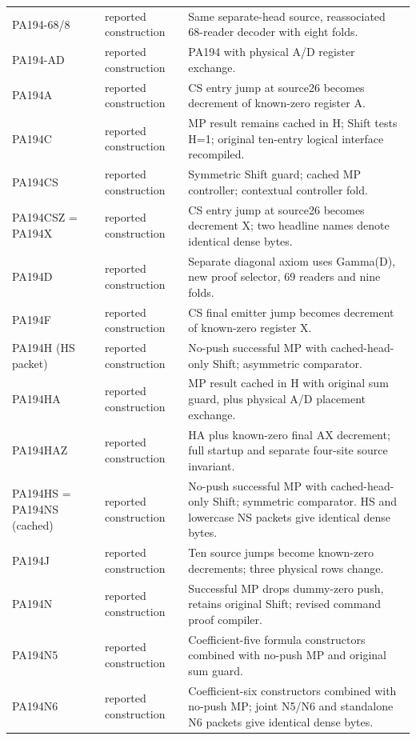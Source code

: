 \begin{longtable}{@{}p{.23\linewidth}p{.14\linewidth}p{.57\linewidth}@{}}
PA194-68/8 & reported construction & Same separate-head source, reassociated 68-reader decoder with eight folds.\\
PA194-AD & reported construction & PA194 with physical A/D register exchange.\\
PA194A & reported construction & CS entry jump at source26 becomes decrement of known-zero register A.\\
PA194C & reported construction & MP result remains cached in H; Shift tests H=1; original ten-entry logical interface recompiled.\\
PA194CS & reported construction & Symmetric Shift guard; cached MP controller; contextual controller fold.\\
PA194CSZ = PA194X & reported construction & CS entry jump at source26 becomes decrement X; two headline names denote identical dense bytes.\\
PA194D & reported construction & Separate diagonal axiom uses Gamma(D), new proof selector, 69 readers and nine folds.\\
PA194F & reported construction & CS final emitter jump becomes decrement of known-zero register X.\\
PA194H (HS packet) & reported construction & No-push successful MP with cached-head-only Shift; asymmetric comparator.\\
PA194HA & reported construction & MP result cached in H with original sum guard, plus physical A/D placement exchange.\\
PA194HAZ & reported construction & HA plus known-zero final AX decrement; full startup and separate four-site source invariant.\\
PA194HS = PA194NS (cached) & reported construction & No-push successful MP with cached-head-only Shift; symmetric comparator. HS and lowercase NS packets give identical dense bytes.\\
PA194J & reported construction & Ten source jumps become known-zero decrements; three physical rows change.\\
PA194N & reported construction & Successful MP drops dummy-zero push, retains original Shift; revised command proof compiler.\\
PA194N5 & reported construction & Coefficient-five formula constructors combined with no-push MP and original sum guard.\\
PA194N6 & reported construction & Coefficient-six constructors combined with no-push MP; joint N5/N6 and standalone N6 packets give identical dense bytes.\\

\end{longtable}
